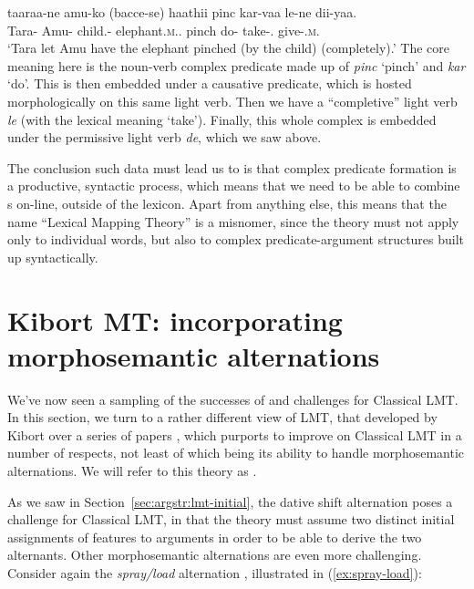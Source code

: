 \documentclass[output=paper]{langscibook}
\begin{document}
\ea
\gll taaraa-ne amu-ko (bacce-se) haathii pinc kar-vaa le-ne dii-yaa.\\
Tara-\ERG{} Amu-\DAT{} child.\OBL-\INS{} elephant.\textsc{m}.\SG.\NOM{} pinch do-\CAUS{}
take-\INF.\OBL{} give-\PRF.\textsc{m}.\SG\\
\glt `Tara let Amu have the elephant pinched (by the child) (completely).'
\z
%
The core meaning here is the noun-verb complex predicate made up of
\textit{pinc} `pinch' and \textit{kar} `do'. This is then embedded under a
causative predicate, which is hosted morphologically on this same light verb.
Then we have a ``completive'' light verb \textit{le} (with the lexical meaning
`take'). Finally, this whole complex is embedded under the permissive light verb
\textit{de}, which we saw above.

The conclusion such data must lead us to is that complex predicate formation is
a productive, syntactic process, which means that we need to be able to combine
\astruc{}s on-line, outside of the lexicon. Apart from anything else, this means
that the name ``Lexical Mapping Theory'' is a misnomer, since the theory must
not apply only to individual words, but also to complex predicate-argument
structures built up syntactically.


\section{Kibort MT: incorporating morphosemantic
  alternations}\label{sec:argstr:morphosemantic-alternations}

We've now seen a sampling of the successes of and challenges for Classical LMT.
In this section, we turn to a rather different view of LMT, that developed by
Kibort over a series of papers
\citep{Kibort2001,Kibort2001,Kibort2007,Kibort:08,Kibort2009,kibort13,kibort14,KM15},
which purports to improve on Classical LMT in a number of respects, not least of
which being its ability to handle morphosemantic alternations. We will refer to
this theory as .

As we saw in Section~\ref{sec:argstr:lmt-initial}, the dative shift alternation poses a
challenge for Classical LMT, in that the theory must assume two distinct initial
assignments of features to arguments in order to be able to derive the two
alternants. Other morphosemantic alternations are even more challenging.
Consider again the \textit{spray\slash load} alternation
\citep[50--51]{levin93}, illustrated in (\ref{ex:spray-load}):
\end{document}
